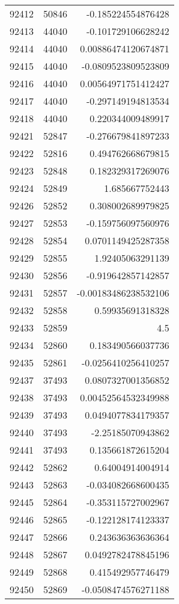 \begin{tabular}{r | r | r}
92412 & 50846 & -0.185224554876428 \\
92413 & 44040 & -0.101729106628242 \\
92414 & 44040 & 0.00886474120674871 \\
92415 & 44040 & -0.0809523809523809 \\
92416 & 44040 & 0.00564971751412427 \\
92417 & 44040 & -0.297149194813534 \\
92418 & 44040 & 0.220344009489917 \\
92421 & 52847 & -0.276679841897233 \\
92422 & 52816 & 0.494762668679815 \\
92423 & 52848 & 0.182329317269076 \\
92424 & 52849 & 1.685667752443 \\
92426 & 52852 & 0.308002689979825 \\
92427 & 52853 & -0.159756097560976 \\
92428 & 52854 & 0.0701149425287358 \\
92429 & 52855 & 1.92405063291139 \\
92430 & 52856 & -0.919642857142857 \\
92431 & 52857 & -0.00183486238532106 \\
92432 & 52858 & 0.59935691318328 \\
92433 & 52859 & 4.5 \\
92434 & 52860 & 0.183490566037736 \\
92435 & 52861 & -0.0256410256410257 \\
92437 & 37493 & 0.0807327001356852 \\
92438 & 37493 & 0.00452564532349988 \\
92439 & 37493 & 0.0494077834179357 \\
92440 & 37493 & -2.25185070943862 \\
92441 & 37493 & 0.135661872615204 \\
92442 & 52862 & 0.64004914004914 \\
92443 & 52863 & -0.034082668600435 \\
92445 & 52864 & -0.353115727002967 \\
92446 & 52865 & -0.122128174123337 \\
92447 & 52866 & 0.243636363636364 \\
92448 & 52867 & 0.0492782478845196 \\
92449 & 52868 & 0.415492957746479 \\
92450 & 52869 & -0.0508474576271188 \\

\end{tabular}
